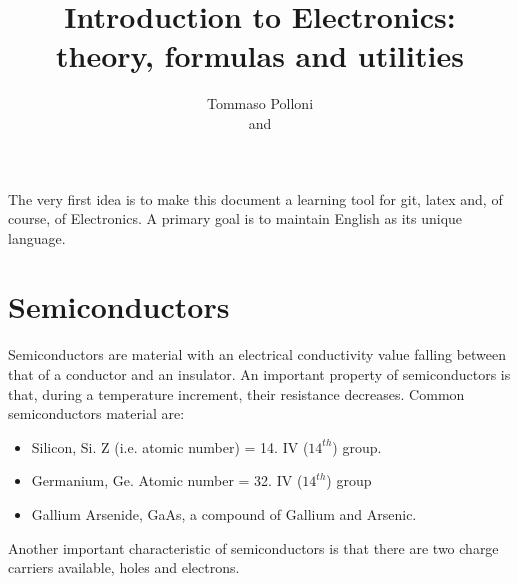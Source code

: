 \documentclass[12pt]{article}
\begin{document}
 
 
 
\title{Introduction to Electronics:\\
theory, formulas and utilities}
\author{Tommaso Polloni\\
and }
 
 The very first idea is to make this document a learning tool for git, latex and, of course, of Electronics. A primary goal is to maintain English as its unique language.
\maketitle
\tableofcontents

\section{Semiconductors} 
Semiconductors are material with an electrical conductivity value falling between that of a conductor and an insulator.
An important property of semiconductors is that, during a temperature increment, their resistance decreases.
Common semiconductors material are:
\begin{itemize}
	\item {}Silicon, Si. Z (i.e. atomic number) = 14. IV ($14^{th}$) group.
	\item Germanium, Ge. Atomic number = 32. IV ($14^{th}$) group
	\item Gallium Arsenide, GaAs, a compound of Gallium and Arsenic.
\end{itemize}
Another important characteristic of semiconductors is that there are two charge carriers available, holes and electrons.

 
\end{document}
